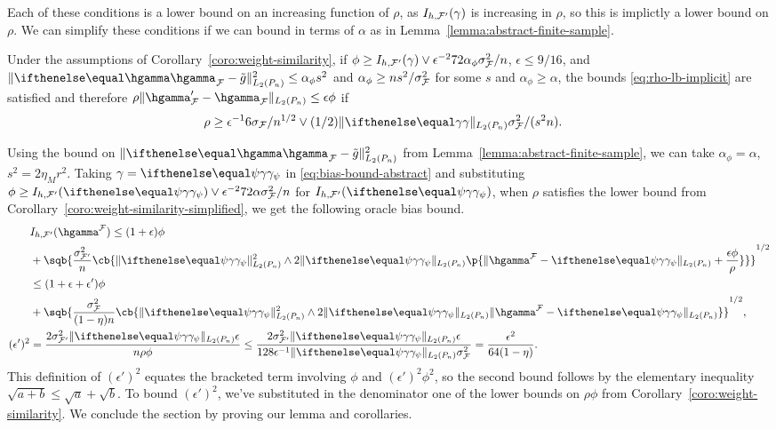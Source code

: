 Each of these conditions is a lower bound on an increasing function of $\rho$, as $I_{h,\mathcal{F}'}(\gamma)$ is increasing in $\rho$,
so this is implictly a lower bound on $\rho$. We can simplify these conditions if we can bound
 in terms of $\alpha$ as in Lemma~\ref{lemma:abstract-finite-sample}.

\begin{coro}
\label{coro:weight-similarity-simplified}
Under the assumptions of Corollary~\ref{coro:weight-similarity},
if $\phi \ge I_{h,\mathcal{F}'}(\gamma) \vee \epsilon^{-2} 72 \alpha_{\phi} \sigma_{\mathcal{F}}^2/n$, $\epsilon \le 9/16$,
and $\norm{\hriesz_{\F} - \gapprox}_{L_2(\Pn)}^2 \le \alpha_{\phi} s^2$ and $\alpha_{\phi} \ge n s^2 / \sigma_{\mathcal{F}}^2$
for some $s$ and $\alpha_{\phi} \ge \alpha$, the bounds \eqref{eq:rho-lb-implicit}
are satisfied and therefore $\rho \norm{\hgamma_{\F}' - \hgamma_{\F}}_{L_2(\Pn)} \le \epsilon \phi$ if 
\begin{align*}
\rho &\ge  \epsilon^{-1} 6 \sigma_\F/n^{1/2} \vee (1/2) \norm{\riesz}_{L_2(\Pn)}  \sigma_\F^2/(s^2 n). 
\end{align*}
\end{coro}
\noindent Using the bound on $\norm{\hriesz_{\F} - \gapprox}_{L_2(\Pn)}^2$ from Lemma~\ref{lemma:abstract-finite-sample}, 
we can take $\alpha_{\phi} = \alpha$, $s^2=2\eta_Mr^2$.
Taking $\gamma=\riesz[\psi]$ in \eqref{eq:bias-bound-abstract}
and substituting $\phi \ge I_{h,\F'}(\riesz[\psi]) \vee \epsilon^{-2} 72 \alpha \sigma_{\F}^2/n$
for $I_{h,\F'}(\riesz[\psi])$, when $\rho$ satisfies the lower bound from Corollary~\ref{coro:weight-similarity-simplified}, we get the following oracle bias bound. 
\begin{equation}
\label{eq:bias-bound-concrete}
\begin{aligned}
&I_{h,\F'}(\hgamma^{\F}) \le (1+\epsilon)\phi \\
&+ \sqb{\frac{\sigma_{\F'}^2}{n}\cb{ \norm{\riesz[\psi]}^2_{L_2(\Pn)} \wedge 2\norm{\riesz[\psi]}_{L_2(\Pn)}\p{\norm{\hgamma^{\F}-\riesz[\psi]}_{L_2(\Pn)} + \frac{\epsilon \phi}{\rho} }}}^{1/2} \\
&\le (1+\epsilon + \epsilon') \phi \\ 
&+ \sqb{\frac{\sigma_{\F}^2}{(1-\eta) n}\cb{\norm{\riesz[\psi]}^2_{L_2(\Pn)} \wedge 2\norm{\riesz[\psi]}_{L_2(\Pn)}\norm{\hgamma^{\F}-\riesz[\psi]}_{L_2(\Pn)}}}^{1/2}, \\
(\epsilon')^2 
&= \frac{2\sigma_{\F'}^2\norm{\riesz[\psi]}_{L_2(\Pn)}\epsilon}{n \rho \phi}
\le \frac{2\sigma_{\F'}^2 \norm{\riesz[\psi]}_{L_2(\Pn)} \epsilon }{128\epsilon^{-1}\norm{\riesz[\psi]}_{L_2(\Pn)}\sigma_{\F}^2} = \frac{\epsilon^2}{64(1-\eta)}.
\end{aligned}
\end{equation}
This definition of $(\epsilon')^2$  equates the bracketed term involving $\phi$ and $(\epsilon')^2\phi^2$, 
so the second bound follows by the elementary inequality $\sqrt{a+b}\le \sqrt{a} + \sqrt{b}$.
To bound $(\epsilon')^2$, we've substituted in the denominator one of the lower bounds on $\rho \phi$ from Corollary~\ref{coro:weight-similarity}. 
We conclude the section by proving our lemma and corollaries.


